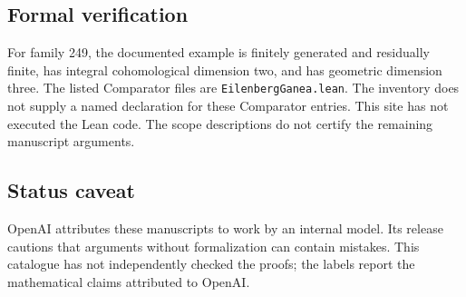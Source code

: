 \documentclass[11pt]{article}
\begin{document}
\subsection{Formal verification}
For family 249, the documented example is finitely generated and residually finite, has integral cohomological dimension two, and has geometric dimension three. The listed Comparator files are \texttt{EilenbergGanea.lean}. The inventory does not supply a named declaration for these Comparator entries. This site has not executed the Lean code. The scope descriptions do not certify the remaining manuscript arguments.

\subsection{Status caveat}
OpenAI attributes these manuscripts to work by an internal model. Its release cautions that arguments without formalization can contain mistakes. This catalogue has not independently checked the proofs; the labels report the mathematical claims attributed to OpenAI.
\end{document}
